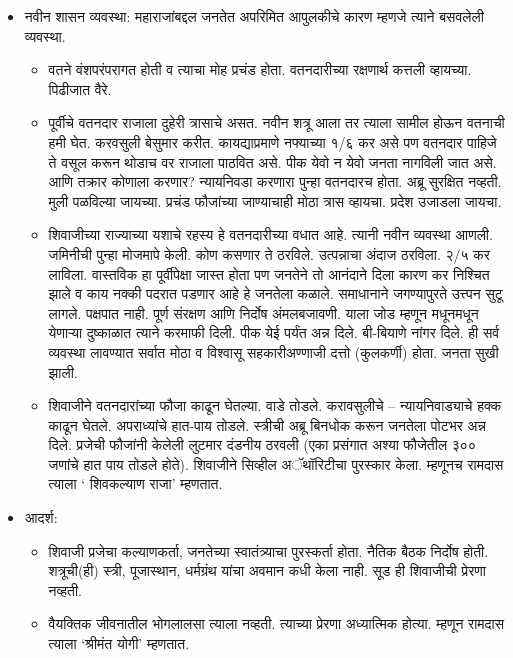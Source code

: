 \begin{itemize}[noitemsep,nolistsep]
\item नवीन शासन व्यवस्था: महाराजांबद्दल जनतेत अपरिमित आपुलकीचे कारण म्हणजे त्याने बसवलेली व्यवस्था.
	\begin{itemize}[noitemsep,nolistsep]
	\item वतने वंशपरंपरागत होती व त्याचा मोह प्रचंड होता. वतनदारीच्या रक्षणार्थ कत्तली व्हायच्या. पिढीजात वैरे. 
	\item पूर्वीचे वतनदार राजाला दुहेरी त्रासाचे असत. नवीन शत्रू आला तर त्याला सामील होऊन वतनाची हमी घेत. करवसुली बेसुमार करीत. कायद्याप्रमाणे नफ्याच्या १/६ कर असे पण वतनदार पाहिजे ते वसूल करून थोडाच वर राजाला पाठवित असे. पीक येवो न येवो जनता नागविली जात असे. आणि तक्रार कोणाला करणार? न्यायनिवडा करणारा पुन्हा वतनदारच होता. अब्रू सुरक्षित नव्हती. मुली पळविल्या जायच्या. प्रचंड फौजांच्या जाण्याचाही मोठा त्रास व्हायचा. प्रदेश उजाडला जायचा.
	\item शिवाजीच्या राज्याच्या यशाचे रहस्य हे वतनदारीच्या वधात आहे. त्यानी नवीन व्यवस्था आणली. जमिनीची पुन्हा मोजमापे केली. कोण कसणार ते ठरविले. उत्पन्नाचा अंदाज ठरविला. २/५ कर लाविला. वास्तविक हा पूर्वीपेक्षा जास्त होता पण जनतेने तो आनंदाने दिला कारण कर निश्चित झाले व काय नक्की पदरात पडणार आहे हे जनतेला कळाले. समाधानाने जगण्यापुरते उत्त्पन सुटू लागले. पक्षपात नाही. पूर्ण संरक्षण आणि निर्दोष अंमलबजावणी. याला जोड म्हणून मधूनमधून येणाऱ्या दुष्काळात त्याने करमाफी दिली. पीक येई पर्यंत अन्न दिले. बी-बियाणे नांगर दिले. ही सर्व व्यवस्था लावण्यात सर्वात मोठा व विश्वासू सहकारीअण्णाजी दत्तो (कुलकर्णी) होता. जनता सुखी झाली.
	\item शिवाजीने वतनदारांच्या फौजा काढून घेतल्या. वाडे तोडले. करावसुलीचे – न्यायनिवाड्याचे हक्क काढून घेतले. अपराध्यांचे हात-पाय तोडले. स्त्रीची अब्रू बिनधोक करून जनतेला पोटभर अन्न दिले. प्रजेची फौजांनी केलेली लुटमार दंडनीय ठरवली (एका प्रसंगात अश्या फौजेतील ३०० जणांचे हात पाय तोडले होते). शिवाजीने सिव्हील अॅथॉरिटीचा पुरस्कार केला. म्हणूनच रामदास त्याला ‘ शिवकल्याण राजा’ म्हणतात.
	\end{itemize}

\item	आदर्श: 
	\begin{itemize}[noitemsep,nolistsep]
	\item शिवाजी प्रजेचा कल्याणकर्ता, जनतेच्या स्वातंत्र्याचा पुरस्कर्ता होता. नैतिक बैठक निर्दोष होती. शत्रूची(ही) स्त्री, पूजास्थान, धर्मग्रंथ यांचा अवमान कधी केला नाही. सूड ही शिवाजीची प्रेरणा नव्हती.
	\item वैयक्तिक जीवनातील भोगलालसा त्याला नव्हती. त्याच्या प्रेरणा अध्यात्मिक होत्या. म्हणून रामदास त्याला ‘श्रीमंत योगी’ म्हणतात.
	\end{itemize}

\end{itemize}
